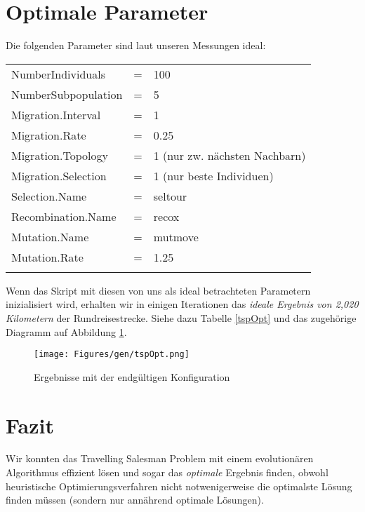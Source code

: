 \section{Optimale Parameter}

Die folgenden Parameter sind laut unseren Messungen ideal: \\

\begin{tabular}{l c l}
  NumberIndividuals   & = & 100       \\
  NumberSubpopulation & = & 5         \\
  Migration.Interval  & = & 1         \\
  Migration.Rate      & = & 0.25      \\
  Migration.Topology  & = & 1 (nur zw. nächsten Nachbarn) \\
  Migration.Selection & = & 1 (nur beste Individuen)      \\
  Selection.Name      & = & seltour   \\
  Recombination.Name  & = & recox     \\
  Mutation.Name       & = & mutmove   \\
  Mutation.Rate       & = & 1.25 \\\\
\end{tabular}

\noindent Wenn das Skript mit diesen von uns als ideal betrachteten
Parametern inizialisiert wird, erhalten wir in einigen Iterationen
das \emph{ideale Ergebnis von 2,020 Kilometern} der Rundreisestrecke.
Siehe dazu Tabelle \ref{tspOpt} und das zugehörige Diagramm
auf Abbildung \ref{fig.tspOpt}.



\begin{figure}[h!]
  \centering
  \texttt{[image: Figures/gen/tspOpt.png]}
  \caption{Ergebnisse mit der endgültigen Konfiguration}\label{fig.tspOpt}
\end{figure}



\section{Fazit}\label{conclusion}

Wir konnten das Travelling Salesman Problem
mit einem evolutionären Algorithmus effizient lösen
und sogar das \emph{optimale} Ergebnis finden, obwohl heuristische
Optimierungsverfahren nicht notwenigerweise die optimalste Lösung finden müssen
(sondern nur annährend optimale Lösungen).

